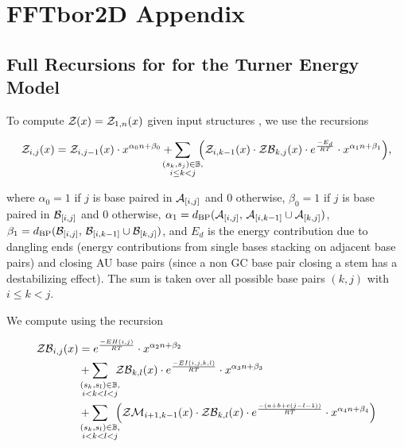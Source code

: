 
\chapter{FFTbor2D Appendix}
\label{ch:ffttwoapp}


\section{Full Recursions for \texorpdfstring{}{}
for the Turner Energy Model}
\label{sec:ffttwo:turner}

To compute ${\mathcal Z}_{}(x) = {\mathcal Z}_{1,n}(x)$ given input structures \strAB,
we use the recursions

\begin{align}
\label{eq:ffttwoapp:zx}
\emZ{i,j} = \emZ{i,j-1} \cdot x^{\ab{0}} +
\sum_{\mathclap{\substack{(s_k,s_j) \in \bpSet, \\ i \leq k < j}}}\enspace
\Big( \emZ{i,k-1} \cdot \emZB{k,j} \cdot \boltzE{E_d} \cdot
x^{\ab{1}} \Big),
\end{align}

where
$\alpha_0 = 1$ if $j$ is base paired in $\mathcal A_{[i,j]}$ and $0$ otherwise,
$\beta_0 = 1$ if $j$ is base paired in $\mathcal B_{[i,j]}$ and $0$ otherwise,
$\alpha_1 = d_{\text{BP}}(\mathcal A_{[i,j]},\,\mathcal A_{[i,k-1]} \cup \mathcal A_{[k,j]})$,
$\beta_1 = d_{\text{BP}}(\mathcal B_{[i,j]},\,\mathcal B_{[i,k-1]} \cup \mathcal B_{[k,j]})$,
and $E_d$ is the energy contribution due to dangling ends (energy
contributions from single bases stacking on adjacent base pairs) and
closing AU base pairs (since a non GC base pair closing a stem has a
destabilizing effect).  The sum is taken over all possible
base pairs $(k,j)$ with $i \leq k < j$.

We compute \emZB{} using the recursion

\begin{align}
\label{eq:ffttwoapp:zbx}
\begin{split}
\emZB{i,j} &= \boltzE{EH(i,j)} \cdot x^{\ab{2}} \\
&+ \sum_{\mathclap{\substack{(s_k,s_l) \in \bpSet, \\ i < k < l < j }}}\enspace
\emZB{k,l} \cdot \boltzE{EI(i,j,k,l)} \cdot x^{\ab{3}} \\
&+ \sum_{\mathclap{\substack{(s_k,s_l) \in \bpSet, \\ i < k < l < j }}}\enspace
\Big( \emZM{i+1,k-1} \cdot \emZB{k,l} \cdot \boltzE{(a+b+c(j-l-1))}
\cdot x^{\ab{4}} \Big)
\end{split}
\end{align}

